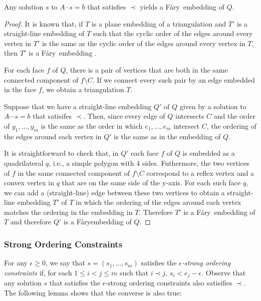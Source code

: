 \documentclass{patmorin}
\newcommand{\Fary}{Fáry}
\begin{document}
\begin{lem}
   Any solution $s$ to $A\cdot s=b$ that satisfies $\prec$ yields a
   \Fary\ embedding of $Q$.
\end{lem}

\begin{proof}
   It is known that, if $T$ is a plane embedding of a triangulation and
   $T'$ is a straight-line embedding of $T$ such that the cyclic order
   of the edges around every vertex in $T'$ is the same as the cyclic
   order of the edges around every vertex in $T$, then $T'$ is a \Fary\
   embedding \cite{X}.

   For each face $f$ of $Q$, there is a pair of vertices that are both
   in the same connected component of $f\setminus C$. If we connect
   every such pair by an edge embedded in the face $f$, we obtain a
   triangulation $T$.

   Suppose that we have a straight-line embedding $Q'$ of $Q$ given by
   a solution to $A\cdots s = b$ that satisifes $\prec$.  Then, since
   every edge of $Q$ intersects $C$ and the order of $y_1,\ldots,y_m$
   is the same as the order in which $e_1,\ldots,e_m$ intersect $C$,
   the ordering of the edges around each vertex in $Q'$ is the same as
   in the embedding of $Q$.

   It is straightforward to check that, in $Q'$ each face $f$ of $Q$ is
   embedded as a quadrilateral $q$, i.e., a simple polygon with 4 sides.
   Futhermore, the two vertices of $f$ in the same connected component of
   $f\setminus C$ correspond to a reflex vertex and a convex vertex in $q$
   that are on the same side of the y-axis.  For each such face $q$, we
   can add a (straight-line) edge between these two vertices to obtain
   a straight-line embedding $T'$ of $T$ in which the ordering of the
   edges around each vertex matches the ordering in the embedding in $T$.
   Therefore $T'$ is a \Fary\ embedding of $T$ and therefore $Q'$ is a
   \Fary embedding of $Q$.
\end{proof}


\subsubsection{Strong Ordering Constraints}

For any $\epsilon \ge 0$, we say that $s=(s_1,\ldots,s_m)$ satisfies
the \emph{$\epsilon$-strong ordering constraints} if, for each $1\le
i<j\le m$ such that $i\prec j$, $s_i < e_j - \epsilon$.  Observe that any
solution $s$ that satisfies the $\epsilon$-strong ordering constraints
also satisifies $\prec$. The following lemma shows that the converse is
also true:
\end{document}
